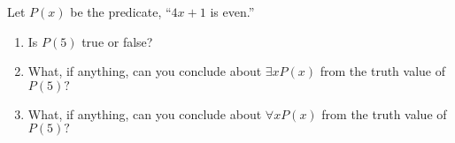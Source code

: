 \documentclass[11pt,]{book}
\theoremstyle{ptxplainnotitle}
\theoremstyle{ptxplaintitle}
\theoremstyle{ptxdefinitionnotitle}
\theoremstyle{ptxdefinitiontitle}
\theoremstyle{ptxdefinitionnotitle}
\theoremstyle{ptxdefinitiontitle}
\theoremstyle{ptxdefinitionnotitle}
\theoremstyle{ptxdefinitiontitle}
\theoremstyle{ptxdefinitiontitlenonumber}
\theoremstyle{ptxdefinitiontitlenonumber}
\numberwithin{equation}{chapter}
\begin{document}
\begin{divisionexercise}{8}\hypertarget{exercise-156}{}
\hypertarget{p-2066}{}%
Let \(P(x)\) be the predicate, ``\(4x+1\) is even.'' \leavevmode%
\begin{enumerate}[label=\alph*.]
\item\hypertarget{li-1017}{}\hypertarget{p-2067}{}%
Is \(P(5)\) true or false? %
\item\hypertarget{li-1022}{}\hypertarget{p-2072}{}%
What, if anything, can you conclude about \(\exists x P(x)\) from the truth value of \(P(5)\text{?}\)%
\item\hypertarget{li-1023}{}\hypertarget{p-2073}{}%
What, if anything, can you conclude about \(\forall x P(x)\) from the truth value of \(P(5)\text{?}\)%
\end{enumerate}
%
\end{divisionexercise}%
\end{document}
